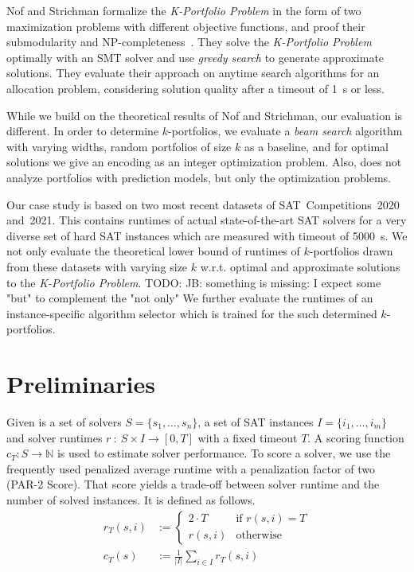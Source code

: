 \documentclass[conference]{IEEEtran}
\newcommand{\todo}[1]{{\color{red}TODO: #1}}
\begin{document}
Nof and Strichman formalize the \emph{K-Portfolio Problem} in the form of two maximization problems with different objective functions, and proof their submodularity and NP-completeness~\cite{nof2020real}. 
They solve the \emph{K-Portfolio Problem} optimally with an SMT solver and use \emph{greedy search} to generate approximate solutions.
They evaluate their approach on anytime search algorithms for an allocation problem, considering solution quality after a timeout of 1~s or less.

While we build on the theoretical results of Nof and Strichman, our evaluation is different.
In order to determine $k$-portfolios, we evaluate a \emph{beam search} algorithm with varying widths, random portfolios of size $k$ as a baseline, and for optimal solutions we give an encoding as an integer optimization problem.
Also, \cite{nof2020real} does not analyze portfolios with prediction models, but only the optimization problems.

Our case study is based on two most recent datasets of SAT~Competitions~2020 and~2021.
This contains runtimes of actual state-of-the-art SAT solvers for a very diverse set of hard SAT instances which are measured with timeout of 5000~s.
We not only evaluate the theoretical lower bound of runtimes of $k$-portfolios drawn from these datasets with varying size $k$ w.r.t. optimal and approximate solutions to the \emph{K-Portfolio Problem}. 
\todo{JB: something is missing: I expect some "but" to complement the "not only"}
We further evaluate the runtimes of an instance-specific algorithm selector which is trained for the such determined $k$-portfolios. 

\section{Preliminaries}
\label{sec:preliminaries}

Given is a set of solvers $S = \{s_1, \dots, s_n\}$, a set of SAT instances $I = \{i_1, \dots, i_m\}$ and solver runtimes $r~:~S \times I \rightarrow [0, T]$ with a fixed timeout $T$.
A scoring function $c_T : S \rightarrow \mathbb{N}$ is used to estimate solver performance. 
To score a solver, we use the frequently used penalized average runtime with a penalization factor of two (PAR-2 Score). 
That score yields a trade-off between solver runtime and the number of solved instances.
It is defined as follows.%
\begin{align}
r_T(s,i) &:= \begin{cases}
	2 \cdot T & \text{if }r(s,i) = T\\
	r(s,i) & \text{otherwise}
\end{cases} \tag*{Penalized Runtimes}\\[.5em]
c_T(s) &:= \frac{1}{|I|} \sum_{i \in I}{r_T(s,i)} \tag*{PAR-2 Score}
\end{align}
\end{document}
